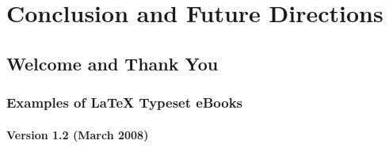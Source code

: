 \chapter{Conclusion and Future Directions}
\label{Chapter6}

\section{Welcome and Thank You}

\subsection{Examples of \LaTeX{} Typeset eBooks}

\subsubsection*{Version 1.2 (March 2008)}
